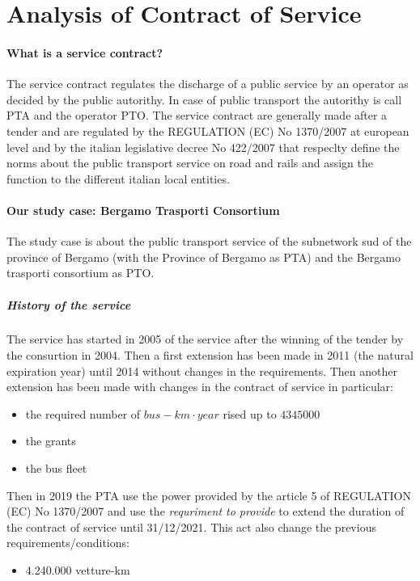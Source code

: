 \section{Analysis of Contract of Service}
\paragraph{What is a service contract?}
The service contract regulates the discharge of a public service by an operator as decided by the public autorithy. In case of public transport the autorithy is call PTA and the operator PTO. The service contract are generally made after a tender and are regulated by the REGULATION (EC) No 1370/2007 at european level and by the italian legislative decree No 422/2007 that respeclty define the norms about the public transport service on road and rails and assign the function to the different italian local entities.

\paragraph{Our study case: Bergamo Trasporti Consortium}
The study case is about the public transport service of the subnetwork sud of the province of Bergamo (with the Province of Bergamo as PTA) and the Bergamo trasporti consortium as PTO.

\subparagraph{History of the service} The service has started in 2005 of the service after the winning of the tender by the consurtion in 2004. Then a first extension has been made in 2011 (the natural expiration year) until 2014 without changes in the requirements. Then another extension has been made with changes in the contract of service in particular:
\begin{itemize}
    \item the required number of $bus-km\cdot year$ rised up to $4345000$
    \item the grants
    \item the bus fleet
\end{itemize}

Then in 2019 the PTA use the power provided by the article 5 of REGULATION (EC) No 1370/2007 and use the \emph{requriment to provide} to extend the duration of the contract of service until 31/12/2021. This act also change the previous requirements/conditions:
\begin{itemize}
    \item 4.240.000 vetture-km
\end{itemize}

